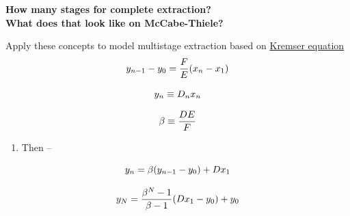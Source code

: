 \documentclass[aspectratio=1610,pdftex,dvipsnames,compress,xcolor={dvipsnames}]{beamer}
\begin{document}
\begin{frame}[plain]{}
    \centering\LARGE\textbf{How many stages for complete extraction?}\\
    \centering\LARGE\textbf{What does that look like on McCabe-Thiele?}
\end{frame}


\addtocounter{framenumber}{-1} 
\begin{frame}{Apply these concepts to model multistage extraction based on \href{http://wwwcourses.sens.buffalo.edu/ce407/notes/ce407_notes_Lecture03.pdf}{Kremser equation}}
    \begin{equation}
        \Large
        y_{n-1} - y_0 = \frac{F}{E}(x_n-x_1)
    \end{equation}
    
    \begin{equation}
        \Large
        y_n \equiv D_nx_n
    \end{equation}
    
    \begin{equation}
        \Large
        \beta \equiv \frac{DE}{F}
    \end{equation}
    
    \vspace*{\fill}

    \begin{enumerate}[topsep=0pt,itemsep=1pt,leftmargin=*,label=(\arabic*)]
        \item[]Then -- 
    \end{enumerate}

    \vspace*{\fill}

    \begin{equation}
        \Large
        y_n = \beta (y_{n-1} - y_0) + Dx_1
    \end{equation}

    \begin{equation}
        \Large
        y_N = \frac{\beta^N - 1}{\beta - 1}(Dx_1-y_0) +y_0
    \end{equation}
\end{frame}
\end{document}
